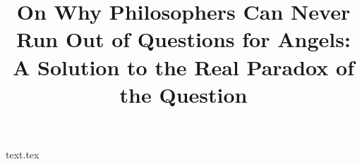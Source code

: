 \documentclass[12pt]{article}
\title{On Why Philosophers Can Never Run Out of Questions for Angels: A Solution to the Real Paradox of the Question}
\author{}
\date{}
\theoremstyle{mytheoremstyle} %
\begin{document}
 
\maketitle 
{text.tex}
\printbibliography[]
\end{document}

